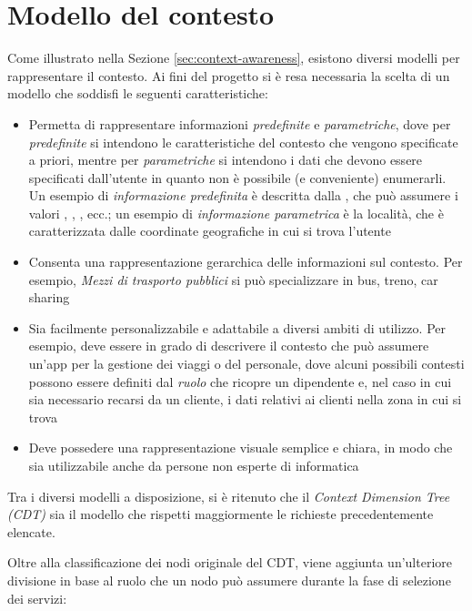 \section{Modello del contesto\label{sec:modello-contesto}}

Come illustrato nella Sezione \ref{sec:context-awareness}, esistono diversi modelli per rappresentare il contesto. Ai fini del progetto si è resa necessaria la scelta di un modello che soddisfi le seguenti caratteristiche:

\begin{itemize}
	\item
	Permetta di rappresentare informazioni \emph{predefinite} e \emph{parametriche}, dove per \emph{predefinite} si intendono le caratteristiche del contesto che vengono specificate a priori, mentre per \emph{parametriche} si intendono i dati che devono essere specificati dall'utente in quanto non è possibile (e conveniente) enumerarli. Un esempio di \emph{informazione predefinita} è descritta dalla , che può assumere i valori , , , ecc.; un esempio di \emph{informazione parametrica} è la località, che è caratterizzata dalle coordinate geografiche in cui si trova l'utente
	\item
	Consenta una rappresentazione gerarchica delle informazioni sul contesto. Per esempio, \emph{Mezzi di trasporto pubblici} si può specializzare in bus, treno, car sharing
	\item
	Sia facilmente personalizzabile e adattabile a diversi ambiti di utilizzo. Per esempio, deve essere in grado di descrivere il contesto che può assumere un'app per la gestione dei viaggi o del personale, dove alcuni possibili contesti possono essere definiti dal \emph{ruolo} che ricopre un dipendente e, nel caso in cui sia necessario recarsi da un cliente, i dati relativi ai clienti nella zona in cui si trova
	\item
	Deve possedere una rappresentazione visuale semplice e chiara, in modo che sia utilizzabile anche da persone non esperte di informatica
\end{itemize}

Tra i diversi modelli a disposizione, si è ritenuto che il \emph{Context Dimension Tree (CDT)} sia il modello che rispetti maggiormente le richieste precedentemente elencate.

Oltre alla classificazione dei nodi originale del CDT, viene aggiunta un'ulteriore divisione in base al ruolo che un nodo può assumere durante la fase di selezione dei servizi:


